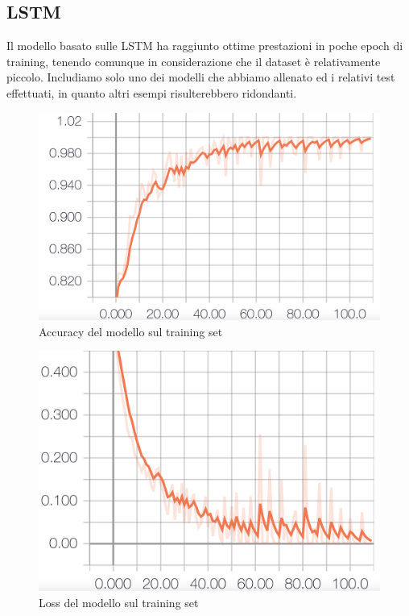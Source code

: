 \documentclass[8pt,notitlepage]{report}
\begin{document}
		\newpage		
		
		\subsection{LSTM}
		
			Il modello basato sulle LSTM ha raggiunto ottime prestazioni in poche epoch di training, tenendo comunque in considerazione che il dataset è relativamente piccolo. Includiamo solo uno dei modelli che abbiamo allenato ed i relativi test effettuati, in quanto altri esempi risulterebbero ridondanti. 
			\begin{figure}[H]
				\begin{center}
					\includegraphics[scale=.1865]{acc_Antonio}
					\caption{Accuracy del modello sul training set}
					\label{fig:acc_train}
				\end{center}
			\end{figure}
			
			\begin{figure}[H]
				\begin{center}
					\includegraphics[scale=.1865]{loss_Antonio}
					\caption{Loss del modello sul training set}
				\end{center}
			\end{figure}
			
\end{document}
